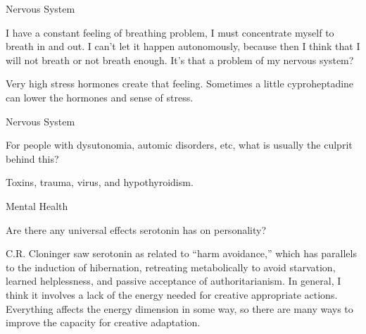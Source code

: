 \documentclass[11pt,oneside,openany,extrafontsizes]{memoir}
\begin{document}
\begin{qaexchange}{Nervous System}

    \begin{question}
        I have a constant feeling of breathing problem, I must concentrate myself to breath in and out. I can't let it happen autonomously, because then I think that I will not breath or not breath enough. It's that a problem of my nervous system?
    \end{question}

    \begin{answer}
        Very high stress hormones create that feeling. Sometimes a little cyproheptadine can lower the hormones and sense of stress.
    \end{answer}
\end{qaexchange}

\begin{qaexchange}{Nervous System}

    \begin{question}
        For people with dysutonomia, automic disorders, etc, what is usually the culprit behind this?
    \end{question}

    \begin{answer}
        Toxins, trauma, virus, and hypothyroidism.
    \end{answer}
\end{qaexchange}

\begin{qaexchange}{Mental Health}

    \begin{question}
        Are there any universal effects serotonin has on personality? 
    \end{question}

    \begin{answer}
      C.R. Cloninger saw serotonin as related to \enquote{harm avoidance,} which has parallels to the induction of hibernation, retreating metabolically to avoid starvation, learned helplessness, and passive acceptance of authoritarianism. In general, I think it involves a lack of the energy needed for creative appropriate actions. Everything affects the energy dimension in some way, so there are many ways to improve the capacity for creative adaptation.
    \end{answer}
\end{qaexchange}
\end{document}

